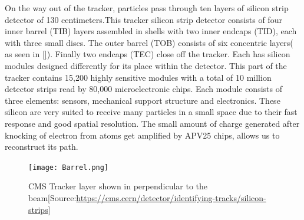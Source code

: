 

On the way out of the tracker, particles pass through ten layers of silicon strip detector of 130 centimeters.This tracker silicon strip detector consists of four inner barrel (TIB) layers assembled in shells with two inner endcaps (TID), each with three small discs. The outer barrel (TOB) consists of six concentric layers( as seen in \autoref{}). Finally two endcaps (TEC) close off the tracker. Each has silicon modules designed differently for its place within the detector. This part of the tracker contains 15,200 highly sensitive modules with a total of 10 million detector strips read by 80,000 microelectronic chips. Each module consists of three elements: sensors, mechanical support structure and electronics. These silicon are very suited to receive many particles in a small space due to their fast response and good spatial resolution. The small amount of charge generated after knocking of electron from atoms get amplified by APV25 chips, allows us to reconstruct its path.


\begin{figure}[H]
    \centering
    \texttt{[image: Barrel.png]}
    \caption{CMS Tracker layer shown in perpendicular to the beam[Source:\url{https://cms.cern/detector/identifying-tracks/silicon-strips}]}
    \label{fig:my_label}
\end{figure}


